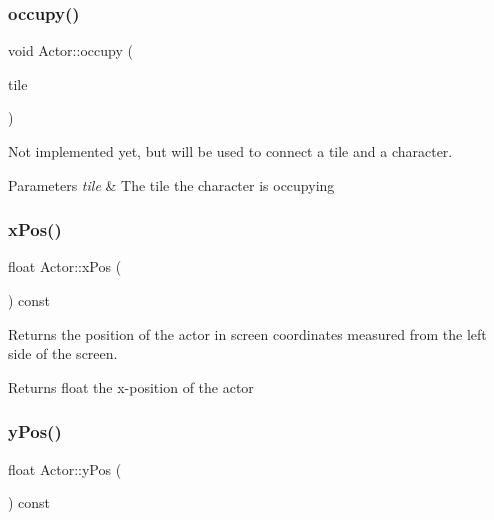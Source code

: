 \mbox{\label{classActor_a75f9ef62ab9b6f7879cf0c1483b73866}} 
\subsubsection{\texorpdfstring{occupy()}{occupy()}}
{\footnotesize\ttfamily void Actor\+::occupy (\begin{DoxyParamCaption}\item[{\mbox{\hyperlink{classTile}{Tile}} $\ast$}]{tile }\end{DoxyParamCaption})}



Not implemented yet, but will be used to connect a tile and a character. 


\begin{DoxyParams}{Parameters}
{\em tile} & The tile the character is occupying \\
\hline
\end{DoxyParams}
\mbox{\label{classActor_ab460c32c344963afcf476926367bd794}} 
\subsubsection{\texorpdfstring{xPos()}{xPos()}}
{\footnotesize\ttfamily float Actor\+::x\+Pos (\begin{DoxyParamCaption}{ }\end{DoxyParamCaption}) const\hspace{0.3cm}{\ttfamily [virtual]}}



Returns the position of the actor in screen coordinates measured from the left side of the screen. 

\begin{DoxyReturn}{Returns}
float the x-\/position of the actor 
\end{DoxyReturn}
\mbox{\label{classActor_a7792909f3e9ca8eff707cf7b21b712fe}} 
\subsubsection{\texorpdfstring{yPos()}{yPos()}}
{\footnotesize\ttfamily float Actor\+::y\+Pos (\begin{DoxyParamCaption}{ }\end{DoxyParamCaption}) const\hspace{0.3cm}{\ttfamily [virtual]}}



